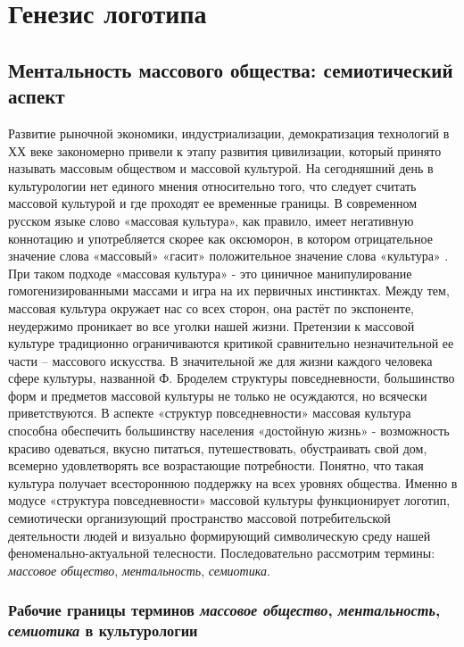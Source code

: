 \section{Генезис логотипа}\label{chapter1}

\subsection{Ментальность массового общества: семиотический аспект}\label{1}
Развитие рыночной экономики, индустриализации, демократизация технологий в ХХ веке закономерно привели к этапу развития цивилизации, который принято называть массовым обществом и массовой культурой. На сегодняшний день в культурологии нет единого мнения относительно того, что следует считать массовой культурой и где проходят ее временные границы. В современном русском языке слово «массовая культура», как правило, имеет негативную коннотацию и употребляется скорее как оксюморон, в котором отрицательное значение слова «массовый» «гасит» положительное значение слова «культура» \autocite{elistratov2012}. При таком подходе «массовая культура» - это циничное манипулирование гомогенизированными массами и игра на их первичных инстинктах. Между тем, массовая культура окружает нас со всех сторон, она растёт по экспоненте, неудержимо проникает во все уголки нашей жизни. Претензии к массовой культуре традиционно ограничиваются критикой сравнительно незначительной ее части – массового искусства. В значительной же для жизни каждого человека сфере культуры, названной Ф. Броделем структуры повседневности, большинство форм и предметов массовой культуры не только не  осуждаются, но всячески приветствуются. В аспекте «структур повседневности» массовая культура способна обеспечить большинству населения «достойную жизнь» - возможность красиво одеваться, вкусно питаться, путешествовать, обустраивать свой дом, всемерно удовлетворять все возрастающие потребности. Понятно, что такая культура получает всестороннюю поддержку на всех уровнях общества. Именно в модусе «структура повседневности» массовой культуры функционирует логотип, семиотически организующий пространство массовой потребительской деятельности людей и визуально формирующий символическую среду нашей феноменально-актуальной телесности\autocite{society}. Последовательно рассмотрим термины: \emph{массовое общество}, \emph{ментальность},
\emph{семиотика}.

\subsubsection{Рабочие границы терминов \emph{массовое общество}, \emph{ментальность}, \emph{семиотика} в культурологии}\label{1.1}
